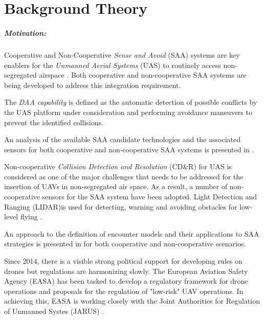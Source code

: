 \cleardoublepage
\chapter{Background Theory}\label{ch:backGroundTheory}

\paragraph{Motivation:} Cooperative and Non-Cooperative \emph{Sense and Avoid} (SAA) systems are key enablers for the \emph{Unmanned Aerial Systems} (UAS) to routinely access non-segregated airspace \cite{spriesterbach2013unmanned}. Both cooperative and non-cooperative SAA systems are being developed to address this integration requirement.

The \emph{DAA capability} is defined as the automatic detection of possible conflicts by the UAS platform under consideration and performing avoidance maneuvers to prevent the identified collisions.

An analysis of the available SAA candidate technologies and the associated sensors for both cooperative and non-cooperative SAA systems is presented in \cite{muraru2011critical}. 

Non-cooperative \emph{Collision Detection and Resolution} (CD\&R) for UAS is considered as one of the major challenges that needs to be addressed \cite{lai2012see} for the insertion of UAVs in non-segregated air space. As a result, a number of non-cooperative sensors for the SAA system have been adopted. Light Detection and Ranging (LIDAR)is used for detecting, warning and avoiding obstacles for low-level flying \cite{sabatini2014lidar}.

An approach to the definition of encounter models and their applications to SAA strategies is presented in \cite{kochenderfer2008encounter} for both cooperative and non-cooperative scenarios.

Since 2014, there is a visible strong political support for developing rules on drones but regulations are harmonizing slowly. The European Aviation Safety Agency (EASA) has been tasked to develop a regulatory framework for drone operations and proposals for the regulation of "low-risk" UAV operations. In achieving this, EASA is working closely with the Joint Authorities for Regulation of Unmanned Systes (JARUS) \cite{jarus2016regulations}.

